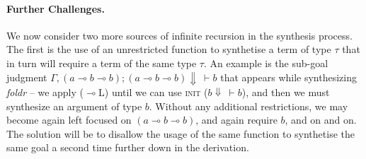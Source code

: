 \documentclass{llncs}
\newcommand{\lolli}{\multimap}
\newcommand{\mypara}[1]{\paragraph{\textbf{#1}.}}
\def\Rho{P}
\begin{document}


\mypara{Further Challenges} We now consider two more sources of infinite
recursion in the synthesis process. The first is the use of an unrestricted
function to synthetise a term of type $\tau$ that in turn will require a term of
the same type $\tau$. An example is the sub-goal judgment $\Gamma,(a \lolli
b \lolli b); (a \lolli b \lolli b) \Downarrow\ \vdash b$ that
appears while synthesizing \emph{foldr} -- we apply ($\lolli$L)
until we can use \textsc{init} ($b \Downarrow\ \vdash b$), and then we must
synthesize an argument of type $b$. Without any additional restrictions, we
may become again left focused on $(a \lolli b \lolli b)$, and again require $b$,
and on and on. The solution will be to disallow the usage of the same function
to synthetise the same goal a second time further down in the derivation.
\end{document}
